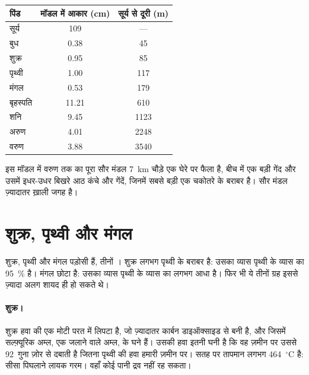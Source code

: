 \begin{center}\small
\begin{tabular}{|l|c|c|}
\hline
\textbf{पिंड} & \textbf{मॉडल में आकार (cm)} & \textbf{सूर्य से दूरी (m)} \\
\hline
सूर्य & 109 & --- \\
बुध & 0.38 & 45 \\
शुक्र & 0.95 & 85 \\
पृथ्वी & 1.00 & 117 \\
मंगल & 0.53 & 179 \\
बृहस्पति & 11.21 & 610 \\
शनि & 9.45 & 1123 \\
अरुण & 4.01 & 2248 \\
वरुण & 3.88 & 3540 \\
\hline
\end{tabular}
\end{center}

इस मॉडल में वरुण तक का पूरा सौर मंडल 7~km चौड़े एक घेरे पर फैला है, बीच में एक बड़ी
गेंद और उसमें इधर-उधर बिखरे आठ कंचे और गेंदें, जिनमें सबसे बड़ी एक चकोतरे के बराबर
है। सौर मंडल ज़्यादातर ख़ाली
जगह है।

\section{शुक्र, पृथ्वी और मंगल}

शुक्र, पृथ्वी और मंगल पड़ोसी हैं, तीनों । शुक्र लगभग पृथ्वी के बराबर
है: उसका व्यास पृथ्वी के व्यास का 95~\% है। मंगल छोटा है: उसका व्यास पृथ्वी के
व्यास का लगभग आधा है। फिर भी ये तीनों ग्रह इससे ज़्यादा अलग शायद ही हो
सकते थे।

\paragraph{शुक्र।} शुक्र हवा की एक मोटी परत में लिपटा है, जो ज़्यादातर कार्बन
डाइऑक्साइड से बनी है, और जिसमें सल्फ़्यूरिक अम्ल, एक जलाने वाले अम्ल, के घने 
हैं। उसकी हवा इतनी घनी है कि वह ज़मीन पर उससे 92~गुना ज़ोर से दबाती है जितना
पृथ्वी की हवा हमारी ज़मीन पर। सतह पर तापमान लगभग
464~$^\circ$C है: सीसा पिघलाने लायक गरम। वहाँ कोई पानी
द्रव नहीं रह सकता।

